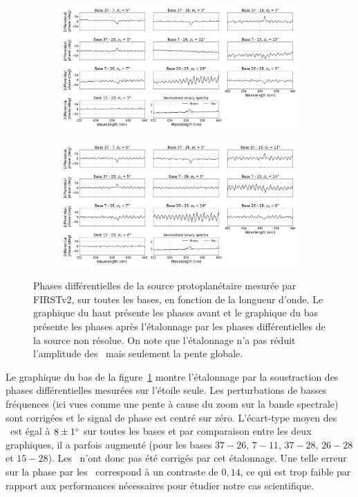 \begin{figure}[ht!]
    \centering
    \begin{subfigure}{\textwidth}
        \centering
        \includegraphics[width=\textwidth]{Figure_Chap4/20221010_Bin01_SpeDiffPhase_Raw_BaseSubplot_Pola1_LaTex.png}
    \end{subfigure}
    \begin{subfigure}{\textwidth}
        \centering
        \includegraphics[width=\textwidth]{Figure_Chap4/20221010_Bin01_SpeDiffPhase_Calp2vm_BaseSubplot_Pola1_LaTex.png}
    \end{subfigure}
    \caption[Phases différentielles de la source protoplanétaire mesurée par FIRSTv2.]{Phases différentielles de la source protoplanétaire mesurée par FIRSTv2, sur toutes les bases, en fonction de la longueur d'onde. Le graphique du haut présente les phases avant et le graphique du bas présente les phases après l'étalonnage par les phases différentielles de la source non résolue. On note que l'étalonnage n'a pas réduit l'amplitude des \wiggles~mais seulement la pente globale.}
    \label{fig:PhaseDiffBinary}
\end{figure}

Le graphique du bas de la figure~\ref{fig:PhaseDiffBinary} montre l'étalonnage par la soustraction des phases différentielles mesurées sur l'étoile seule. Les perturbations de basses fréquences (ici vues comme une pente à cause du zoom sur la bande spectrale) sont corrigées et le signal de phase est centré sur zéro. L'écart-type moyen des \wiggles~est égal à $8 \pm 1^{\circ}$ sur toutes les bases et par comparaison entre les deux graphiques, il a parfois augmenté (pour les bases $37-26$, $7-11$, $37-28$, $26-28$ et $15-28$). Les \wiggles~n'ont donc pas été corrigés par cet étalonnage. Une telle erreur sur la phase par les \wiggles~correspond à un contraste de $0,14$, ce qui est trop faible par rapport aux performances nécessaires pour étudier notre cas scientifique.

